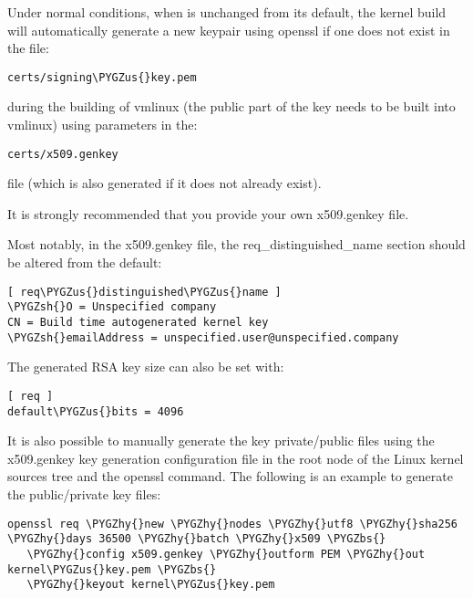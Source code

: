 \documentclass[a4paper,8pt,english]{sphinxmanual}
\def\PYGZbs{\char`\\}
\def\PYGZus{\char`\_}
\def\PYGZsh{\char`\#}
\def\PYGZhy{\char`\-}
\begin{document}
Under normal conditions, when  is unchanged from its
default, the kernel build will automatically generate a new keypair using
openssl if one does not exist in the file:

\begin{Verbatim}[commandchars=\\\{\}]
certs/signing\PYGZus{}key.pem
\end{Verbatim}

during the building of vmlinux (the public part of the key needs to be built
into vmlinux) using parameters in the:

\begin{Verbatim}[commandchars=\\\{\}]
certs/x509.genkey
\end{Verbatim}

file (which is also generated if it does not already exist).

It is strongly recommended that you provide your own x509.genkey file.

Most notably, in the x509.genkey file, the req\_distinguished\_name section
should be altered from the default:

\begin{Verbatim}[commandchars=\\\{\}]
[ req\PYGZus{}distinguished\PYGZus{}name ]
\PYGZsh{}O = Unspecified company
CN = Build time autogenerated kernel key
\PYGZsh{}emailAddress = unspecified.user@unspecified.company
\end{Verbatim}

The generated RSA key size can also be set with:

\begin{Verbatim}[commandchars=\\\{\}]
[ req ]
default\PYGZus{}bits = 4096
\end{Verbatim}

It is also possible to manually generate the key private/public files using the
x509.genkey key generation configuration file in the root node of the Linux
kernel sources tree and the openssl command.  The following is an example to
generate the public/private key files:

\begin{Verbatim}[commandchars=\\\{\}]
openssl req \PYGZhy{}new \PYGZhy{}nodes \PYGZhy{}utf8 \PYGZhy{}sha256 \PYGZhy{}days 36500 \PYGZhy{}batch \PYGZhy{}x509 \PYGZbs{}
   \PYGZhy{}config x509.genkey \PYGZhy{}outform PEM \PYGZhy{}out kernel\PYGZus{}key.pem \PYGZbs{}
   \PYGZhy{}keyout kernel\PYGZus{}key.pem
\end{Verbatim}
\end{document}
